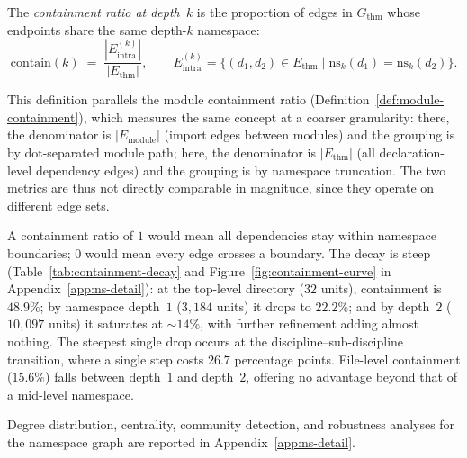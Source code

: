 \begin{definition}
\label{def:containment}
The \emph{containment ratio at depth~$k$} is the proportion of edges in $G_{\mathrm{thm}}$ whose endpoints share the same depth-$k$ namespace:
\[
  \mathrm{contain}(k) \;=\; \frac{|E_{\mathrm{intra}}^{(k)}|}{|E_{\mathrm{thm}}|},
  \qquad
  E_{\mathrm{intra}}^{(k)} = \{(d_1,d_2) \in E_{\mathrm{thm}} \mid \mathrm{ns}_k(d_1) = \mathrm{ns}_k(d_2)\}.
\]
\end{definition}

\noindent
This definition parallels the module containment ratio (Definition~\ref{def:module-containment}), which measures the same concept at a coarser granularity: there, the denominator is $|E_{\mathrm{module}}|$ (import edges between modules) and the grouping is by dot-separated module path; here, the denominator is $|E_{\mathrm{thm}}|$ (all declaration-level dependency edges) and the grouping is by namespace truncation. The two metrics are thus not directly comparable in magnitude, since they operate on different edge sets.

A containment ratio of $1$ would mean all dependencies stay within namespace boundaries; $0$ would mean every edge crosses a boundary. The decay is steep (Table~\ref{tab:containment-decay} and Figure~\ref{fig:containment-curve} in Appendix~\ref{app:ns-detail}): at the top-level directory ($32$ units), containment is $48.9\%$; by namespace depth~$1$ ($3{,}184$ units) it drops to $22.2\%$; and by depth~$2$ ($10{,}097$ units) it saturates at ${\sim}14\%$, with further refinement adding almost nothing. The steepest single drop occurs at the discipline--sub-discipline transition, where a single step costs $26.7$ percentage points. File-level containment ($15.6\%$) falls between depth~$1$ and depth~$2$, offering no advantage beyond that of a mid-level namespace.

Degree distribution, centrality, community detection, and robustness analyses for the namespace graph are reported in Appendix~\ref{app:ns-detail}.

